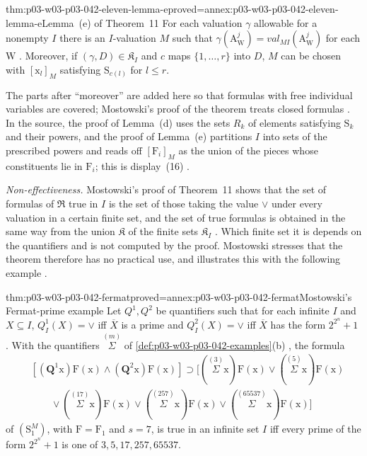 \begin{hblemma}{thm:p03-w03-p03-042-eleven-lemma-e}{proved=annex:p03-w03-p03-042-eleven-lemma-e}{Lemma~(e) of Theorem~11}
For each valuation \(\gamma\) allowable for a nonempty \(I\) there is an
\(I\)-valuation \(M\) such that \(\gamma(\mathrm A^j_{\mathrm W})=
\mathit{val}_{MI}(\mathrm A^j_{\mathrm W})\) for each \(\mathrm W\)
\cite[p.~34]{Mostowski1957}.  Moreover, if \((\gamma,D)\in\mathfrak K_I\)
and \(c\) maps \(\{1,\ldots,r\}\) into \(D\), \(M\) can be chosen with
\([\mathrm x_l]_M\) satisfying \(\mathrm S_{c(l)}\) for \(l\leq r\).
\end{hblemma}

The parts after ``moreover'' are added here so that formulas with free
individual variables are covered; Mostowski's proof of the theorem
treats closed formulas \cite[p.~35]{Mostowski1957}.  In the source, the
proof of Lemma~(d) uses the sets \(R_k\) of elements satisfying
\(\mathrm S_k\) and their powers, and the proof of Lemma~(e) partitions
\(I\) into sets of the prescribed powers and reads off \([\mathrm
F_i]_M\) as the union of the pieces whose constituents lie in \(\mathrm
F_i\); this is display~(16) \cite[p.~34]{Mostowski1957}.

\emph{Non-effectiveness.}  Mostowski's proof of Theorem~11 shows that the
set of formulas of \(\mathfrak R\) true in \(I\) is the set of those taking
the value \(\vee\) under every valuation in a certain finite set, and
the set of true formulas is obtained in the same way from the union
\(\mathfrak K\) of the finite sets \(\mathfrak K_I\)
\cite[p.~35]{Mostowski1957}.  Which finite set it is depends on the
quantifiers and is not computed by the proof.  Mostowski stresses that
the theorem therefore has no practical use, and illustrates this with the
following example \cite[p.~35]{Mostowski1957}.

\begin{hbtheorem}{thm:p03-w03-p03-042-fermat}{proved=annex:p03-w03-p03-042-fermat}{Mostowski's Fermat-prime example}
Let \(Q^1,Q^2\) be quantifiers such that for each infinite \(I\) and
\(X\subseteq I\), \(Q^1_I(X)=\vee\) iff \(\overline X\) is a
prime and \(Q^2_I(X)=\vee\) iff \(\overline X\) has the form
\(2^{2^n}+1\) \cite[p.~35]{Mostowski1957}.  With the quantifiers
\(\overset{(m)}{\Sigma}\) of \cref{def:p03-w03-p03-042-examples}(b)
\cite[p.~35, note~12]{Mostowski1957}, the formula
\[
 \begin{aligned}
 &[(\mathbf Q^1\mathrm x)\mathrm F(\mathrm x)\wedge(\mathbf Q^2\mathrm x)
 \mathrm F(\mathrm x)]\supset[(\overset{(3)}{\Sigma}\mathrm x)\mathrm
 F(\mathrm x)\vee(\overset{(5)}{\Sigma}\mathrm x)\mathrm F(\mathrm x)\\
 &\qquad\vee(\overset{(17)}{\Sigma}\mathrm x)\mathrm F(\mathrm x)\vee
 (\overset{(257)}{\Sigma}\mathrm x)\mathrm F(\mathrm x)\vee
 (\overset{(65537)}{\Sigma}\mathrm x)\mathrm F(\mathrm x)]
 \end{aligned}
\]
of \((\mathrm S^M_1)\), with \(\mathrm F=\mathrm F_1\) and \(s=7\), is true
in an infinite set \(I\) iff every prime
of the form \(2^{2^n}+1\) is one of \(3,5,17,257,65537\).
\end{hbtheorem}


